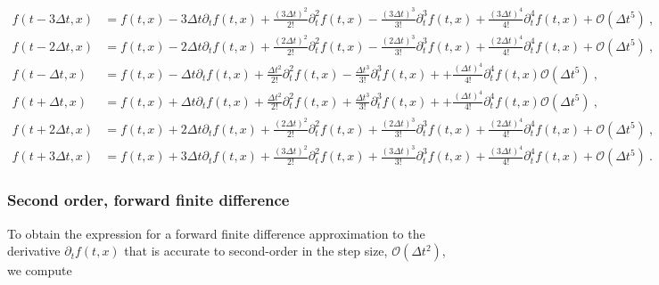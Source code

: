 \documentclass[a4paper,11pt]{article}
\begin{document}
\begin{equation}
\begin{aligned}
f(t-3\Delta t,x) &= f(t,x) - 3\Delta t \partial_{t}f(t,x) + \frac{\left(3\Delta t\right)^{2}}{2!}\partial_{t}^{2}f(t,x) - \frac{\left(3\Delta t\right)^{3}}{3!}\partial_{t}^{3}f(t,x) + \frac{\left(3\Delta t\right)^{4}}{4!}\partial_{t}^{4}f(t,x) + \mathcal{O}\left(\Delta t^{5}\right)\ ,\\
f(t-2\Delta t,x) &= f(t,x) - 2\Delta t \partial_{t}f(t,x) + \frac{\left(2\Delta t\right)^{2}}{2!}\partial_{t}^{2}f(t,x) - \frac{\left(2\Delta t\right)^{3}}{3!}\partial_{t}^{3}f(t,x) + \frac{\left(2\Delta t\right)^{4}}{4!}\partial_{t}^{4}f(t,x) + \mathcal{O}\left(\Delta t^{5}\right)\ ,\\
f(t-\Delta t,x) &= f(t,x) - \Delta t \partial_{t}f(t,x) + \frac{\Delta t^{2}}{2!}\partial_{t}^{2}f(t,x) - \frac{\Delta t^{3}}{3!}\partial_{t}^{3}f(t,x) + + \frac{\left(\Delta t\right)^{4}}{4!}\partial_{t}^{4}f(t,x) \mathcal{O}\left(\Delta t^{5}\right)\ ,\\
f(t+\Delta t,x) &= f(t,x) + \Delta t \partial_{t}f(t,x) + \frac{\Delta t^{2}}{2!}\partial_{t}^{2}f(t,x) + \frac{\Delta t^{3}}{3!}\partial_{t}^{3}f(t,x) + + \frac{\left(\Delta t\right)^{4}}{4!}\partial_{t}^{4}f(t,x) \mathcal{O}\left(\Delta t^{5}\right)\ ,\\
f(t+2\Delta t,x) &= f(t,x) + 2\Delta t \partial_{t}f(t,x) + \frac{\left(2\Delta t\right)^{2}}{2!}\partial_{t}^{2}f(t,x) + \frac{\left(2\Delta t\right)^{3}}{3!}\partial_{t}^{3}f(t,x) + \frac{\left(2\Delta t\right)^{4}}{4!}\partial_{t}^{4}f(t,x) +  \mathcal{O}\left(\Delta t^{5}\right)\ ,\\
f(t+3\Delta t,x) &= f(t,x) + 3\Delta t \partial_{t}f(t,x) + \frac{\left(3\Delta t\right)^{2}}{2!}\partial_{t}^{2}f(t,x) + \frac{\left(3\Delta t\right)^{3}}{3!}\partial_{t}^{3}f(t,x) + \frac{\left(3\Delta t\right)^{4}}{4!}\partial_{t}^{4}f(t,x) + \mathcal{O}\left(\Delta t^{5}\right)\ .
\end{aligned}
\end{equation}

\subsubsection{Second order, forward finite difference}

To obtain the expression for a forward finite difference approximation to the derivative $\partial_{t}f(t,x)$ that is accurate to second-order in the step size, $\mathcal{O}\left(\Delta t^{2}\right)$, we compute
\end{document}
